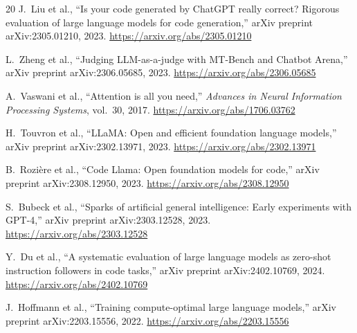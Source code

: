 \documentclass[conference]{IEEEtran}
\begin{document}
\begin{thebibliography}{20}
J.\ Liu et al., ``Is your code generated by ChatGPT really correct? Rigorous
evaluation of large language models for code generation,''
arXiv preprint arXiv:2305.01210, 2023.
\url{https://arxiv.org/abs/2305.01210}

L.\ Zheng et al., ``Judging LLM-as-a-judge with MT-Bench and Chatbot Arena,''
arXiv preprint arXiv:2306.05685, 2023.
\url{https://arxiv.org/abs/2306.05685}

A.\ Vaswani et al., ``Attention is all you need,''
\textit{Advances in Neural Information Processing Systems}, vol.~30, 2017.
\url{https://arxiv.org/abs/1706.03762}

H.\ Touvron et al., ``LLaMA: Open and efficient foundation language models,''
arXiv preprint arXiv:2302.13971, 2023.
\url{https://arxiv.org/abs/2302.13971}

B.\ Rozière et al., ``Code Llama: Open foundation models for code,''
arXiv preprint arXiv:2308.12950, 2023.
\url{https://arxiv.org/abs/2308.12950}

S.\ Bubeck et al., ``Sparks of artificial general intelligence: Early experiments 
with GPT-4,'' arXiv preprint arXiv:2303.12528, 2023.
\url{https://arxiv.org/abs/2303.12528}

Y.\ Du et al., ``A systematic evaluation of large language models as zero-shot 
instruction followers in code tasks,'' arXiv preprint arXiv:2402.10769, 2024.
\url{https://arxiv.org/abs/2402.10769}

J.\ Hoffmann et al., ``Training compute-optimal large language models,''
arXiv preprint arXiv:2203.15556, 2022.
\url{https://arxiv.org/abs/2203.15556}

\end{thebibliography}
\end{document}
